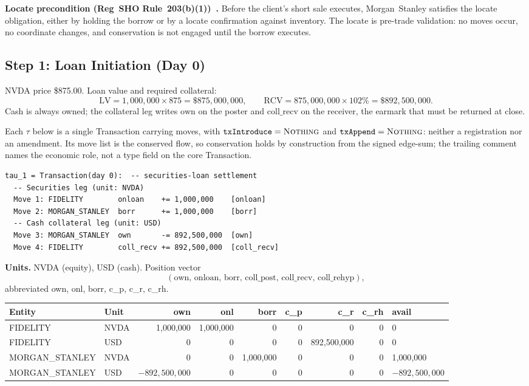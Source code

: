 \documentclass[11pt,a4paper]{article}
\begin{document}
\medskip
\noindent\textbf{Locate precondition (Reg~SHO Rule~203(b)(1))~\cite{regsho}.} Before the client's short sale executes, Morgan~Stanley satisfies the locate obligation, either by holding the borrow or by a locate confirmation against inventory. The locate is pre-trade validation: no moves occur, no coordinate changes, and conservation is not engaged until the borrow executes.

\subsection{Step 1: Loan Initiation (Day 0)}
\label{sec:us-step1}

NVDA price \$875.00. Loan value and required collateral:
\[
\mathrm{LV} = 1{,}000{,}000 \times 875 = \$875{,}000{,}000, \qquad
\mathrm{RCV} = 875{,}000{,}000 \times 102\% = \$892{,}500{,}000.
\]
Cash is always owned; the collateral leg writes $\mathrm{own}$ on the poster and $\mathrm{coll\_recv}$ on the receiver, the earmark that must be returned at close.

\noindent Each $\tau$ below is a single Transaction carrying moves, with $\mathtt{txIntroduce}=\textsc{Nothing}$ and $\mathtt{txAppend}=\textsc{Nothing}$: neither a registration nor an amendment. Its move list is the conserved flow, so conservation holds by construction from the signed edge-sum; the trailing comment names the economic role, not a type field on the core Transaction.

\begin{lstlisting}
tau_1 = Transaction(day 0):  -- securities-loan settlement
  -- Securities leg (unit: NVDA)
  Move 1: FIDELITY        onloan    += 1,000,000    [onloan]
  Move 2: MORGAN_STANLEY  borr      += 1,000,000    [borr]
  -- Cash collateral leg (unit: USD)
  Move 3: MORGAN_STANLEY  own       -= 892,500,000  [own]
  Move 4: FIDELITY        coll_recv += 892,500,000  [coll_recv]
\end{lstlisting}

\noindent\textbf{Units.} NVDA (equity), USD (cash). Position vector
\[(\mathrm{own},\,\mathrm{onloan},\,\mathrm{borr},\,\mathrm{coll\_post},\,\mathrm{coll\_recv},\,\mathrm{coll\_rehyp}),\]
abbreviated own, onl, borr, c\_p, c\_r, c\_rh.

\begin{center}\footnotesize\setlength{\tabcolsep}{4pt}
\begin{tabular}{l l r r r r r r l}
\toprule
\textbf{Entity} & \textbf{Unit} & own & onl & borr & c\_p & c\_r & c\_rh & avail \\
\midrule
FIDELITY & NVDA & 1{,}000{,}000 & 1{,}000{,}000 & 0 & 0 & 0 & 0 & 0 \\
FIDELITY & USD & 0 & 0 & 0 & 0 & 892{,}500{,}000 & 0 & 0 \\
\midrule
MORGAN\_STANLEY & NVDA & 0 & 0 & 1{,}000{,}000 & 0 & 0 & 0 & 1{,}000{,}000 \\
MORGAN\_STANLEY & USD & $-892{,}500{,}000$ & 0 & 0 & 0 & 0 & 0 & $-892{,}500{,}000$ \\
\bottomrule
\end{tabular}
\end{center}
\end{document}

